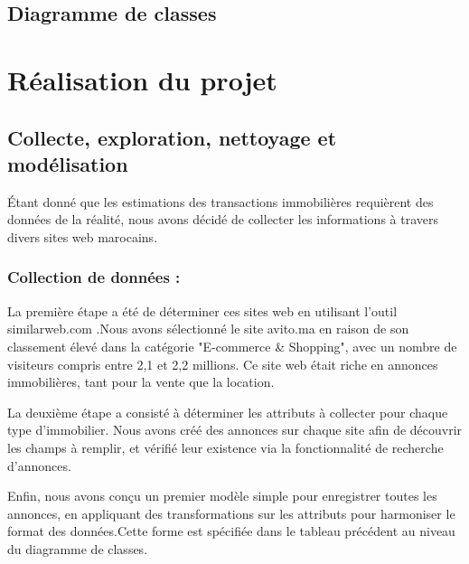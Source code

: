 \documentclass[a4paper,12pt]{report}
\numberwithin{equation}{section}
\begin{document}
\section{Diagramme de classes}
\vspace{0.5cm}

\newpage
\chapter{Réalisation du projet}
\section{Collecte, exploration, nettoyage et modélisation}
\par Étant donné que les estimations des transactions immobilières requièrent des données de la réalité, nous avons décidé de collecter les informations à travers divers sites web marocains. 
\subsection{Collection de données : }
\par La première étape a été de déterminer ces sites web en utilisant l'outil similarweb.com .Nous avons sélectionné le site avito.ma en raison de son classement élevé dans la catégorie "E-commerce \& Shopping", avec un nombre de visiteurs compris entre 2,1 et 2,2 millions. Ce site web était riche en annonces immobilières, tant pour la vente que la location.
\\ \par
La deuxième étape a consisté à déterminer les attributs à collecter pour chaque type d'immobilier. Nous avons créé des annonces sur chaque site afin de découvrir les champs à remplir, et vérifié leur existence via la fonctionnalité de recherche d'annonces.
\\ \par 
Enfin, nous avons conçu un premier modèle simple pour enregistrer toutes les annonces, en appliquant des transformations sur les attributs pour harmoniser le format des données.Cette forme est spécifiée dans le tableau précédent au niveau du diagramme de classes.
\end{document}
